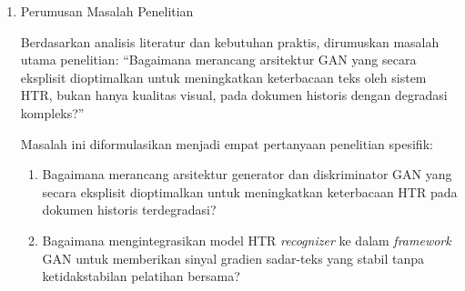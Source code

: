 \begin{enumerate}[label=\arabic*., leftmargin=*, nosep]
          \begin{enumerate}[label=(\alph*), leftmargin=*, nosep]
              \item Kesenjangan Metodologis---Ketidakstabilan Pelatihan Bersama: Metode yang ada menggunakan \textit{joint training} antara generator dan \textit{recognizer}, yang berpotensi menyebabkan ketidakstabilan optimisasi. Belum ada eksplorasi sistematis terhadap strategi \textit{frozen recognizer} sebagai evaluator objektif yang stabil.

              \item Kesenjangan Arsitektural---Evaluasi \textit{Single-Modal}: Diskriminator yang ada hanya mengevaluasi kualitas visual (\textit{single-modal} CNN), tanpa eksplorasi arsitektur \textit{dual-modal} yang dapat menangkap koherensi tekstual melalui jalur sekuensial (LSTM). Meskipun kontribusi empirisnya perlu divalidasi, eksplorasi ini penting untuk melengkapi pemahaman teoretis tentang evaluasi bilateral visual-tekstual dalam konteks GAN berorientasi HTR.

              \item Kesenjangan Evaluasi---Optimasi \textit{Loss Function}: Tidak ada studi ablasi sistematis yang mengidentifikasi konfigurasi optimal untuk menyeimbangkan komponen fungsi \textit{loss} (piksel, \textit{adversarial}, perseptual, CTC) guna mencapai keseimbangan Pareto antara kualitas visual dan keterbacaan HTR.
          \end{enumerate}

    \item Perumusan Masalah Penelitian

          Berdasarkan analisis literatur dan kebutuhan praktis, dirumuskan masalah utama penelitian: ``Bagaimana merancang arsitektur GAN yang secara eksplisit dioptimalkan untuk meningkatkan keterbacaan teks oleh sistem HTR, bukan hanya kualitas visual, pada dokumen historis dengan degradasi kompleks?''

          Masalah ini diformulasikan menjadi empat pertanyaan penelitian spesifik:

          \begin{enumerate}[label=RQ\arabic*:, leftmargin=*, nosep]
              \item Bagaimana merancang arsitektur generator dan diskriminator GAN yang secara eksplisit dioptimalkan untuk meningkatkan keterbacaan HTR pada dokumen historis terdegradasi?

              \item Bagaimana mengintegrasikan model HTR \textit{recognizer} ke dalam \textit{framework} GAN untuk memberikan sinyal gradien sadar-teks yang stabil tanpa ketidakstabilan pelatihan bersama?


\end{enumerate}
\end{enumerate}
